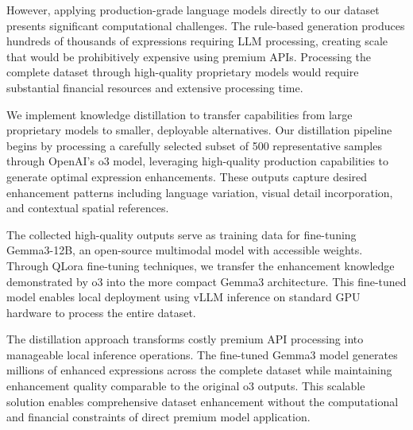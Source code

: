 However, applying production-grade language models directly to our dataset presents significant computational challenges. The rule-based generation produces hundreds of thousands of expressions requiring LLM processing, creating scale that would be prohibitively expensive using premium APIs. Processing the complete dataset through high-quality proprietary models would require substantial financial resources and extensive processing time.

We implement knowledge distillation to transfer capabilities from large proprietary models to smaller, deployable alternatives. Our distillation pipeline begins by processing a carefully selected subset of 500 representative samples through OpenAI's o3 model, leveraging high-quality production capabilities to generate optimal expression enhancements. These outputs capture desired enhancement patterns including language variation, visual detail incorporation, and contextual spatial references.

The collected high-quality outputs serve as training data for fine-tuning Gemma3-12B, an open-source multimodal model with accessible weights. Through QLora fine-tuning techniques, we transfer the enhancement knowledge demonstrated by o3 into the more compact Gemma3 architecture. This fine-tuned model enables local deployment using vLLM inference on standard GPU hardware to process the entire dataset.

The distillation approach transforms costly premium API processing into manageable local inference operations. The fine-tuned Gemma3 model generates millions of enhanced expressions across the complete dataset while maintaining enhancement quality comparable to the original o3 outputs. This scalable solution enables comprehensive dataset enhancement without the computational and financial constraints of direct premium model application.

